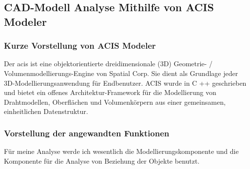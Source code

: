 \documentclass[14pt,a4paper,titlepage]{article}
\begin{document}
			
		\subsection{CAD-Modell Analyse Mithilfe von ACIS Modeler}
			\subsubsection{Kurze Vorstellung von ACIS Modeler}
			Der \ac{acis} ist eine objektorientierte dreidimensionale (3D) Geometrie- / Volumenmodellierungs-Engine von Spatial Corp. Sie dient als Grundlage jeder 3D-Modellierungsanwendung für Endbenutzer. ACIS wurde in C ++ geschrieben und bietet ein offenes Architektur-Framework für die Modellierung von Drahtmodellen, Oberflächen und Volumenkörpern aus einer gemeinsamen, einheitlichen Datenstruktur.
			\subsubsection{Vorstellung der angewandten Funktionen}
			Für meine Analyse werde ich wesentlich die Modellierungskomponente und die Komponente für die Analyse von Beziehung der Objekte benutzt. 
\end{document}
